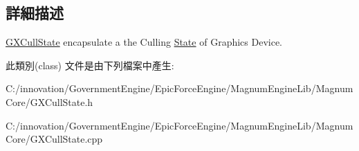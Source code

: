 \subsection{詳細描述}
\hyperlink{class_i_dream_sky_1_1_g_x_cull_state}{G\+X\+Cull\+State} encapsulate a the Culling \hyperlink{class_i_dream_sky_1_1_state}{State} of Graphics Device. 

此類別(class) 文件是由下列檔案中產生\+:\begin{DoxyCompactItemize}
\item 
C\+:/innovation/\+Government\+Engine/\+Epic\+Force\+Engine/\+Magnum\+Engine\+Lib/\+Magnum\+Core/G\+X\+Cull\+State.\+h\item 
C\+:/innovation/\+Government\+Engine/\+Epic\+Force\+Engine/\+Magnum\+Engine\+Lib/\+Magnum\+Core/G\+X\+Cull\+State.\+cpp\end{DoxyCompactItemize}
